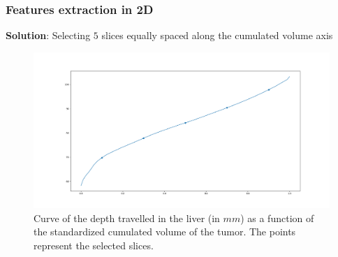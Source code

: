 \documentclass{beamer}
\begin{document}
\begin{frame}
    \frametitle{Features extraction in 2D}
    \textbf{Solution}: Selecting $5$ slices equally spaced along the cumulated volume axis
    \begin{figure}
        \centering
        \includegraphics[scale = 0.15]{images/curve_points.png}
        \caption{Curve of the depth travelled in the liver  (in $mm$) as a function of the standardized cumulated volume of the tumor. The points represent the selected slices.}
    \end{figure}
\end{frame}
\end{document}
